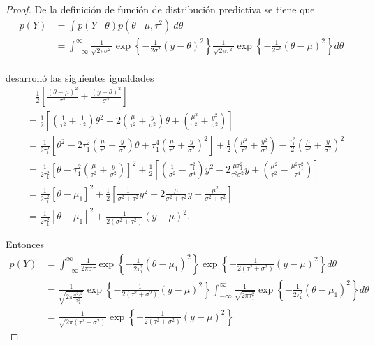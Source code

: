\documentclass[10pt,openright]{book}\usepackage[]{graphicx}\usepackage[]{color}
\begin{document}
    \begin{proof}
    De la definici\'on de funci\'on de distribuci\'on predictiva se tiene que
    \begin{align*}
    p(Y)&=\int p(Y \mid \theta)p(\theta \mid \mu,\tau^2)\ d\theta\\
    &=\int_{-\infty}^{\infty} \frac{1}{\sqrt{2\pi\sigma^2}}\exp\left\{-\frac{1}{2\sigma^2}(y-\theta)^2\right\}
    \frac{1}{\sqrt{2\pi\tau^2}}\exp\left\{-\frac{1}{2\tau^2}(\theta-\mu)^2\right\}d\theta\\
    \end{align*}
    
     desarroll\'o las siguientes igualdades
    \begin{align*}
    &\ \ \ \ \frac{1}{2}\left[\frac{(\theta-\mu)^2}{\tau^2}+\frac{(y-\theta)^2}{\sigma^2}\right]\\
    &=\frac{1}{2}\left[\left(\frac{1}{\tau^2}+\frac{1}{\sigma^2}\right)\theta^2-2\left(\frac{\mu}{\tau^2}+\frac{y}{\sigma^2}\right)\theta+\left(\frac{\mu^2}{\tau^2}+\frac{y^2}{\sigma^2}\right)\right]\\
    &=\frac{1}{2\tau_1^2}\left[\theta^2-2\tau_1^2\left(\frac{\mu}{\tau^2}+\frac{y}{\sigma^2}\right)\theta+\tau_1^4\left(\frac{\mu}{\tau^2}+\frac{y}{\sigma^2}\right)^2\right]+\frac{1}{2}\left(\frac{\mu^2}{\tau^2}+\frac{y^2}{\sigma^2}\right)-\frac{\tau_1^2}{2}\left(\frac{\mu}{\tau^2}+\frac{y}{\sigma^2}\right)^2\\
    &=\frac{1}{2\tau_1^2}\left[\theta-\tau_1^2\left(\frac{\mu}{\tau^2}+\frac{y}{\sigma^2}\right)\right]^2+\frac{1}{2}\left[\left(\frac{1}{\sigma^2}-\frac{\tau_1^2}{\sigma^4}\right)y^2-2\frac{\mu\tau_1^2}{\tau^2\sigma^2}y+\left(\frac{\mu^2}{\tau^2}-\frac{\mu^2\tau_1^2}{\tau^4}\right)\right]\\
    &=\frac{1}{2\tau_1^2}\left[\theta-\mu_1\right]^2+\frac{1}{2}\left[\frac{1}{\sigma^2+\tau^2}y^2-2\frac{\mu}{\sigma^2+\tau^2}y+\frac{\mu^2}{\sigma^2+\tau^2}\right]\\
    &=\frac{1}{2\tau_1^2}\left[\theta-\mu_1\right]^2+\frac{1}{2(\sigma^2+\tau^2)}(y-\mu)^2.
    \end{align*}
    
    
    Entonces
    \begin{align*}
    p(Y)&=\int_{-\infty}^{\infty} \frac{1}{2\pi\sigma\tau}\exp\left\{-\frac{1}{2\tau_1^2}(\theta-\mu_1)^2\right\}
    \exp\left\{-\frac{1}{2(\tau^2+\sigma^2)}(y-\mu)^2\right\}d\theta\\
    &= \frac{1}{\sqrt{2\pi\frac{\sigma^2\tau^2}{\tau_1^2}}}\exp\left\{-\frac{1}{2(\tau^2+\sigma^2)}(y-\mu)^2\right\}
    \int_{-\infty}^{\infty} \frac{1}{\sqrt{2\pi\tau_1^2}}\exp\left\{-\frac{1}{2\tau_1^2}(\theta-\mu_1)^2\right\}d\theta\\
    &= \frac{1}{\sqrt{2\pi(\tau^2+\sigma^2)}}\exp\left\{-\frac{1}{2(\tau^2+\sigma^2)}(y-\mu)^2\right\}
    \end{align*}
    \end{proof}
    
\end{document}
